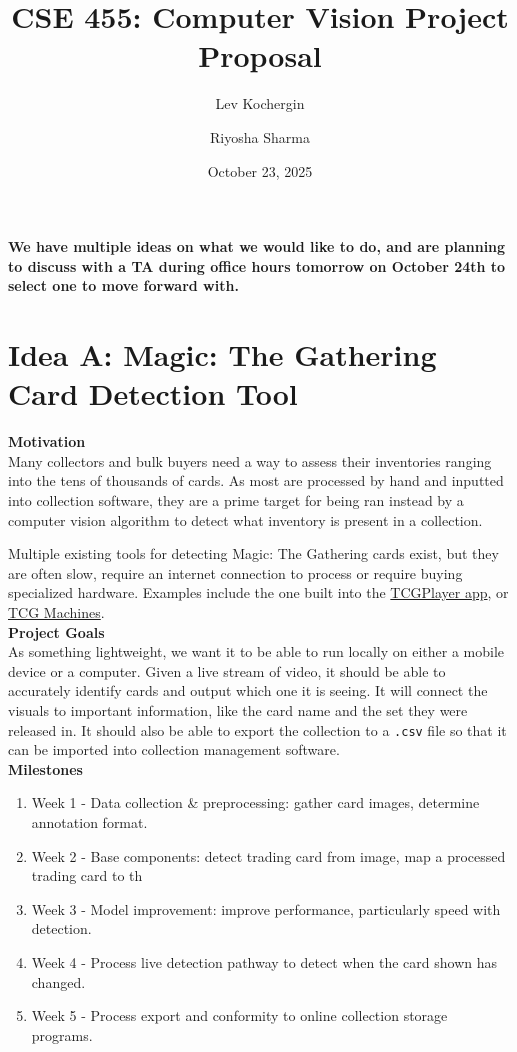 \documentclass{article}
\title{CSE 455: Computer Vision Project Proposal}
\author{Lev Kochergin \and Riyosha Sharma}
\date{October 23, 2025}
\begin{document}
\maketitle

\textbf{We have multiple ideas on what we would like to do, and are planning to discuss with a TA during office hours tomorrow on October 24th to select one to move forward with.}

\section*{Idea A: Magic: The Gathering Card Detection Tool}

\textbf{Motivation} \\
Many collectors and bulk buyers need a way to assess their inventories ranging into the tens of thousands of cards. As most are processed by hand and inputted into collection software, they are a prime target for being ran instead by a computer vision algorithm to detect what inventory is present in a collection.

Multiple existing tools for detecting Magic: The Gathering cards exist, but they are often slow, require an internet connection to process or require buying specialized hardware. Examples include the one built into the \href{https://apps.apple.com/us/app/tcgplayer/id1247645833}{TCGPlayer app}, or \href{https://tcgmachines.com/product}{TCG Machines}. \\

\textbf{Project Goals} \\
As something lightweight, we want it to be able to run locally on either a mobile device or a computer. Given a live stream of video, it should be able to accurately identify cards and output which one it is seeing. It will connect the visuals to important information, like the card name and the set they were released in. It should also be able to export the collection to a \texttt{.csv} file so that it can be imported into collection management software. \\

\textbf{Milestones}
\begin{enumerate}
    \item Week 1 - Data collection \& preprocessing: gather card images, determine annotation format.
    \item Week 2 - Base components: detect trading card from image, map a processed trading card to th
    \item Week 3 - Model improvement: improve performance, particularly speed with detection.
    \item Week 4 - Process live detection pathway to detect when the card shown has changed.
    \item Week 5 - Process export and conformity to online collection storage programs.
\end{enumerate}
\end{document}
